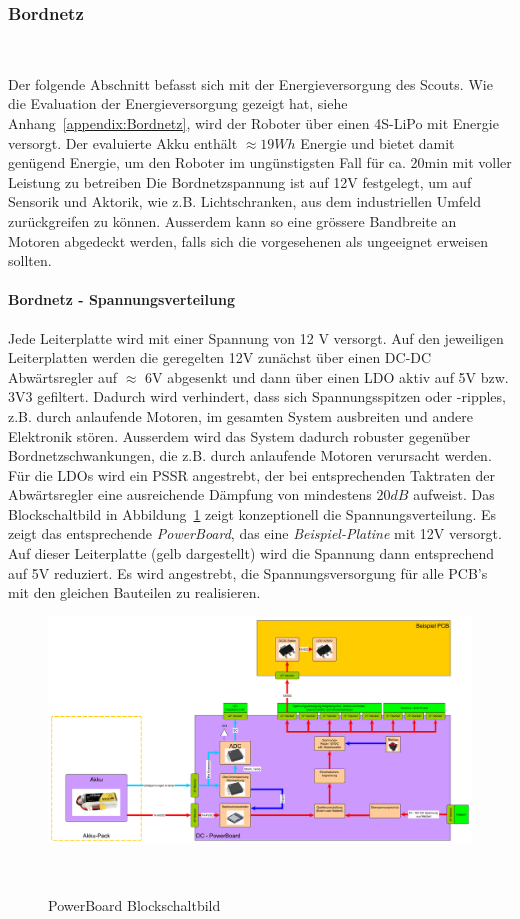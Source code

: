 \documentclass[main.tex]{subfiles} %
\begin{document}

\subsubsection{Bordnetz}~\label{sec:Bordnetz}

Der folgende Abschnitt befasst sich mit der Energieversorgung des Scouts. Wie
die Evaluation der Energieversorgung gezeigt hat, siehe
Anhang~\ref{appendix:Bordnetz}, wird der Roboter über einen 4S-LiPo mit Energie
versorgt. Der evaluierte Akku enthält $\approx 19Wh$ Energie und bietet damit
genügend Energie, um den Roboter im ungünstigsten Fall für ca. 20min mit voller
Leistung zu betreiben Die Bordnetzspannung ist auf 12V festgelegt, um auf
Sensorik und Aktorik, wie z.B. Lichtschranken, aus dem industriellen Umfeld
zurückgreifen zu können. Ausserdem kann so eine grössere Bandbreite an Motoren
abgedeckt werden, falls sich die vorgesehenen als ungeeignet erweisen sollten.

\paragraph{Bordnetz - Spannungsverteilung}
Jede Leiterplatte wird mit einer Spannung von 12 V versorgt. Auf den jeweiligen
Leiterplatten werden die geregelten 12V zunächst über einen DC-DC Abwärtsregler
auf $\approx$ 6V abgesenkt und dann über einen LDO aktiv auf 5V bzw. 3V3
gefiltert. Dadurch wird verhindert, dass sich Spannungsspitzen oder -ripples,
z.B. durch anlaufende Motoren, im gesamten System ausbreiten und andere
Elektronik stören. Ausserdem wird das System dadurch robuster gegenüber
Bordnetzschwankungen, die z.B. durch anlaufende Motoren verursacht werden. Für
die LDOs wird ein PSSR angestrebt, der bei entsprechenden Taktraten der
Abwärtsregler eine ausreichende Dämpfung von mindestens $20dB$ aufweist. Das
Blockschaltbild in Abbildung~\ref{PowerBoard_Blockschaltbild} zeigt
konzeptionell die Spannungsverteilung. Es zeigt das entsprechende
\textit{PowerBoard}, das eine \textit{Beispiel-Platine} mit 12V versorgt. Auf
dieser Leiterplatte (gelb dargestellt) wird die Spannung dann entsprechend auf
5V reduziert. Es wird angestrebt, die Spannungsversorgung für alle PCB's mit
den gleichen Bauteilen zu realisieren.

\begin{figure}[H]
    \centering
    \includegraphics[width = 1\linewidth]{fig_Bordnetz/PowerBoard-Blockschaltbild.pdf}
    \caption{PowerBoard Blockschaltbild}~\label{PowerBoard_Blockschaltbild}
\end{figure}
\end{document}
